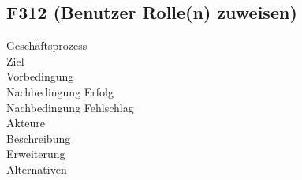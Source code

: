 \subsection{F312 (Benutzer Rolle(n) zuweisen)}
\begin{description}
  \item[Geschäftsprozess]
  \item[Ziel]
  \item[Vorbedingung]
  \item[Nachbedingung Erfolg]
  \item[Nachbedingung Fehlschlag]
  \item[Akteure]
  \item[Beschreibung]
  \item[Erweiterung]
  \item[Alternativen]
\end{description}
